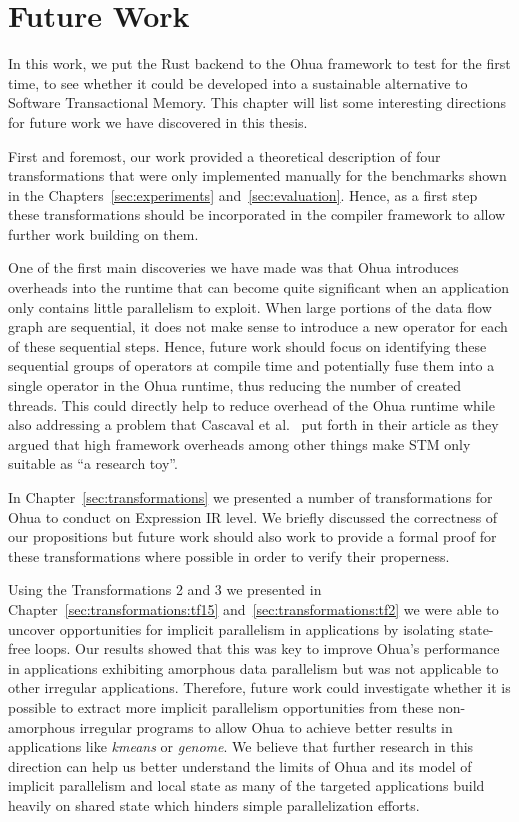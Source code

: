 %
\chapter{Future Work}
\label{sec:future}

In this work, we put the Rust backend to the Ohua framework to test for the first time, to see whether it could be developed into a sustainable alternative to Software Transactional Memory.
This chapter will list some interesting directions for future work we have discovered in this thesis.

First and foremost, our work provided a theoretical description of four transformations that were only implemented manually for the benchmarks shown in the Chapters~\ref{sec:experiments} and~\ref{sec:evaluation}.
Hence, as a first step these transformations should be incorporated in the compiler framework to allow further work building on them.

One of the first main discoveries we have made was that Ohua introduces overheads into the runtime that can become quite significant when an application only contains little parallelism to exploit.
When large portions of the data flow graph are sequential, it does not make sense to introduce a new operator for each of these sequential steps.
Hence, future work should focus on identifying these sequential groups of operators at compile time and potentially fuse them into a single operator in the Ohua runtime, thus reducing the number of created threads.
This could directly help to reduce overhead of the Ohua runtime while also addressing a problem that Cascaval et al.~\cite{cascaval2008software} put forth in their article as they argued that high framework overheads among other things make STM only suitable as \enquote{a research toy}.

In Chapter~\ref{sec:transformations} we presented a number of transformations for Ohua to conduct on Expression IR level.
We briefly discussed the correctness of our propositions but future work should also work to provide a formal proof for these transformations where possible in order to verify their properness.

Using the Transformations 2 and 3 we presented in Chapter~\ref{sec:transformations:tf15} and~\ref{sec:transformations:tf2} we were able to uncover opportunities for implicit parallelism in applications by isolating state-free loops.
Our results showed that this was key to improve Ohua's performance in applications exhibiting amorphous data parallelism but was not applicable to other irregular applications.
Therefore, future work could investigate whether it is possible to extract more implicit parallelism opportunities from these non-amorphous irregular programs to allow Ohua to achieve better results in applications like \emph{kmeans} or \emph{genome}.
We believe that further research in this direction can help us better understand the limits of Ohua and its model of implicit parallelism and local state as many of the targeted applications build heavily on shared state which hinders simple parallelization efforts.

